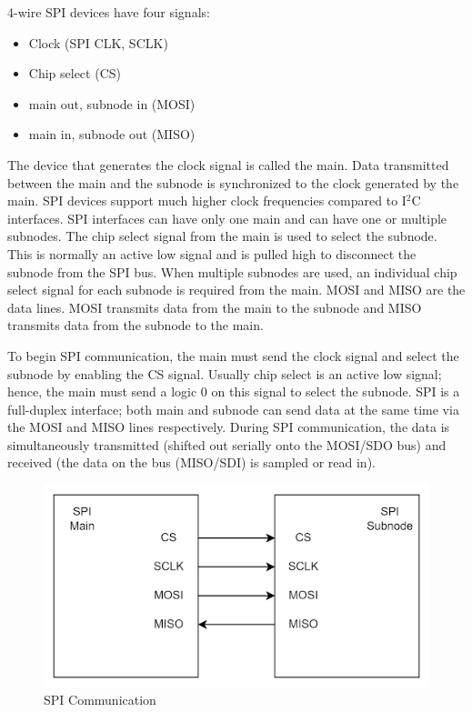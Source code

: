 \documentclass[a4paper,12pt]{report}
\begin{document}
4-wire SPI devices have four signals:

\begin{itemize}
  \item Clock (SPI CLK, SCLK)
  \item Chip select (CS)
  \item main out, subnode in (MOSI)
  \item main in, subnode out (MISO)
\end{itemize}

The device that generates the clock signal is called the main.
Data transmitted between the
main and the subnode is synchronized to the clock generated by the main.
SPI devices support much higher clock frequencies
compared to I$^2$C interfaces.
SPI interfaces can have only one main
and can have one or multiple subnodes.
The chip select signal from the main is used to select the subnode.
This is normally an active low signal and is pulled high
to disconnect the subnode from the SPI bus. When multiple subnodes are used,
an individual chip select signal for each subnode is required from the main.
MOSI and MISO are the data lines.
MOSI transmits data
from the main to the subnode and MISO transmits data
from the subnode to the main.

To begin SPI communication,
the main must send the clock signal and select the subnode
by enabling the CS signal.
Usually chip select is an active low signal; hence,
the main must send a logic 0 on this signal to select the subnode.
SPI is a full-duplex interface;
both main and subnode can send data at the same time
via the MOSI and MISO lines respectively.
During SPI communication,
the data is simultaneously transmitted
(shifted out serially onto the MOSI/SDO bus)
and received (the data on the bus (MISO/SDI) is sampled or read in).

\begin{figure}
  \begin{center}
    \includegraphics[clip, keepaspectratio, width=0.5\linewidth]{img/SPI_communication.png}
    \caption{SPI Communication}
    \label{fig:SPI_Communication}
  \end{center}
\end{figure}
\end{document}
